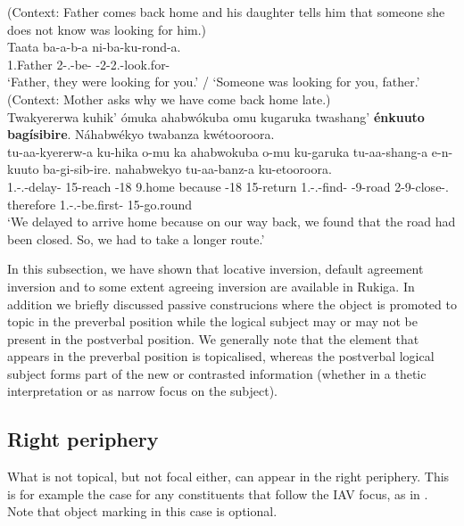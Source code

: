 \documentclass[output=paper]{langscibook}
\begin{document}
\z

\ea
\label{bkm:Ref127351280}
(Context: Father comes back home and his daughter tells him that someone she does not know was looking for him.)\\
\gll
Taata  ba-a-b-a  ni-ba-ku-rond-a.\\
1.Father  2\SM{}-\N{}.\PST{}-{}be-\FV{}  \IPFV{}-2\SM{}-2\SG{}.\OM{}-{}look.for-\FV{}\\
\glt
‘Father, they were looking for you.’ / ‘Someone was looking for you, father.’\\


\z
\pagebreak
\ea
\label{bkm:Ref113456853}
(Context: Mother asks why we have come back home late.)\\
Twakyererwa kuhik’ ómuka ahabwókuba omu kugaruka twashang’ \textbf{énkuuto bagísibire}. Náhabwékyo twabanza kwétooroora.\\
\gll
tu-aa-kyererw-a  ku-hika  o-mu  ka  ahabwokuba  o-mu  ku-garuka  tu-aa-shang-a  e-n-kuuto  ba-gi-sib-ire.  nahabwekyo  tu-aa-banz-a  ku-etooroora.\\
1\PL{}.\SM{}-\N{}.\PST{}-{}delay-\FV{}  15-reach  \AUG{}-{}18  9.home  because  \AUG{}-{}18  15-return  1\PL{}.\SM{}-\N{}.\PST{}-{}find-\FV{}  \AUG{}-{}9-road  2\SM{}-{}9\OM{}-close-\PFV{}.{}  therefore  1\PL{}.\SM{}-\N{}.\PST{}-{}be.first-\FV{}  15-go.round\\
\glt
‘We delayed to arrive home because on our way back, we found that the road had been closed. So, we had to take a longer route.’\\


\z

In this subsection, we have shown that locative inversion, default agreement inversion and to some extent agreeing inversion are available in Rukiga. In addition we briefly discussed passive construcions where the object is promoted to topic in the preverbal position while the logical subject may or may not be present in the postverbal position. We generally note that the element that appears in the preverbal position is topicalised, whereas the postverbal logical subject forms part of the new or contrasted information (whether in a thetic interpretation or as narrow focus on the subject).

\subsection{Right periphery}
\label{bkm:Ref100082426}
What is not topical, but not focal either, can appear in the right periphery. This is for example the case for any constituents that follow the IAV focus, as in . Note that object marking in this case is optional.
\end{document}
